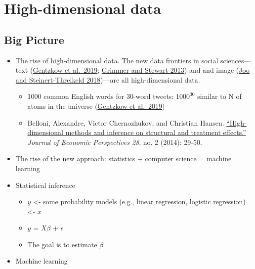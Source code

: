 \documentclass[
]{book}
\begin{document}
\hypertarget{machine_learning}{%
\chapter{High-dimensional data}\label{machine_learning}}

\hypertarget{big-picture}{%
\section{Big Picture}\label{big-picture}}

\begin{itemize}
\item
  The rise of high-dimensional data. The new data frontiers in social sciences---text (\href{https://web.stanford.edu/~gentzkow/research/text-as-data.pdf}{Gentzkow et al.~2019}; \href{https://www.jstor.org/stable/pdf/24572662.pdf?casa_token=SQdSI4R_VdwAAAAA:4QiVLhCXqr9f0qNMM9U75EL5JbDxxnXxUxyIfDf0U8ZzQx9szc0xVqaU6DXG4nHyZiNkvcwGlgD6H0Lxj3y0ULHwgkf1MZt8-9TPVtkEH9I4AHgbTg}{Grimmer and Stewart 2013}) and and image (\href{https://arxiv.org/pdf/1810.01544}{Joo and Steinert-Threlkeld 2018})---are all high-dimensional data.

  \begin{itemize}
  \item
    1000 common English words for 30-word tweets: \(1000^{30}\) similar to N of atoms in the universe (\href{https://web.stanford.edu/~gentzkow/research/text-as-data.pdf}{Gentzkow et al.~2019})
  \item
    Belloni, Alexandre, Victor Chernozhukov, and Christian Hansen. \href{https://pubs.aeaweb.org/doi/pdfplus/10.1257/jep.28.2.29}{``High-dimensional methods and inference on structural and treatment effects.''} \emph{Journal of Economic Perspectives 28}, no. 2 (2014): 29-50.
  \end{itemize}
\item
  The rise of the new approach: statistics + computer science = machine learning
\item
  Statistical inference

  \begin{itemize}
  \item
    \(y\) \textless- some probability models (e.g., linear regression, logistic regression) \textless- \(x\)
  \item
    \(y\) = \(X\beta\) + \(\epsilon\)
  \item
    The goal is to estimate \(\beta\)
  \end{itemize}
\item
  Machine learning


\end{itemize}
\end{document}
